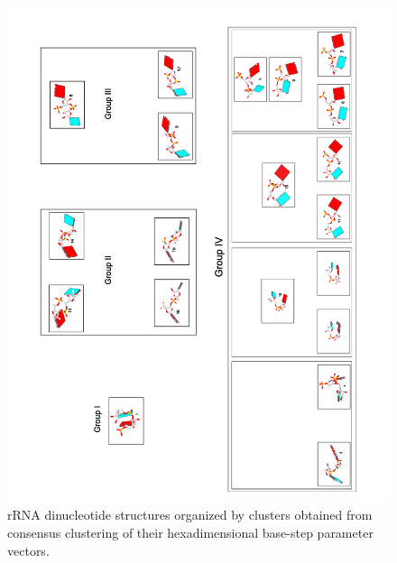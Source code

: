 \begin{figure}[htbp]
 \centering
\includegraphics[angle=0, scale=0.8]{Chapter2/Clustered.png}
 \caption{rRNA dinucleotide structures organized by clusters obtained from
consensus clustering of their hexadimensional base-step parameter vectors.}
 \label{fig:nonAclus}
\end{figure}

